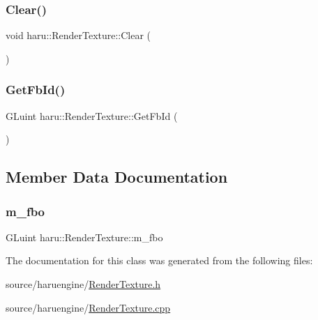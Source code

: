 \subsubsection{\texorpdfstring{Clear()}{Clear()}}
{\footnotesize\ttfamily void haru\+::\+Render\+Texture\+::\+Clear (\begin{DoxyParamCaption}{ }\end{DoxyParamCaption})}

\mbox{\label{classharu_1_1_render_texture_acafa41032f3c155504d130c5ae43600b}} 
\subsubsection{\texorpdfstring{Get\+Fb\+Id()}{GetFbId()}}
{\footnotesize\ttfamily G\+Luint haru\+::\+Render\+Texture\+::\+Get\+Fb\+Id (\begin{DoxyParamCaption}{ }\end{DoxyParamCaption})}



\subsection{Member Data Documentation}
\mbox{\label{classharu_1_1_render_texture_aa41c747cc61bf1c34fa64422cfdacc8c}} 
\subsubsection{\texorpdfstring{m\+\_\+fbo}{m\_fbo}}
{\footnotesize\ttfamily G\+Luint haru\+::\+Render\+Texture\+::m\+\_\+fbo\hspace{0.3cm}{\ttfamily [private]}}



The documentation for this class was generated from the following files\+:\begin{DoxyCompactItemize}
\item 
source/haruengine/\mbox{\hyperlink{_render_texture_8h}{Render\+Texture.\+h}}\item 
source/haruengine/\mbox{\hyperlink{_render_texture_8cpp}{Render\+Texture.\+cpp}}\end{DoxyCompactItemize}
